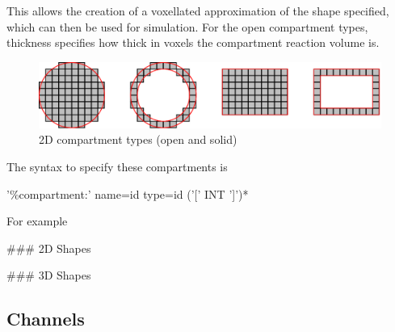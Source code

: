 \medskip 

This allows the creation of a voxellated approximation of the shape specified, which can then be used for simulation. For the open compartment types, thickness specifies how thick in voxels the compartment reaction volume is.

\begin{figure}[h!]
 \centering
 \includegraphics[scale=0.2]{./images/compartmentTypes.png}
 \caption{2D compartment types (open and solid)}
 \label{fig:compartmentTypes}
\end{figure}



The syntax to specify these compartments is
\begin{bnfsource}
'\%compartment:' name=id type=id ('[' INT ']')*
\end{bnfsource}
For example
\begin{kappasource}
### 2D Shapes


### 3D Shapes

\end{kappasource}



\subsection{Channels}


